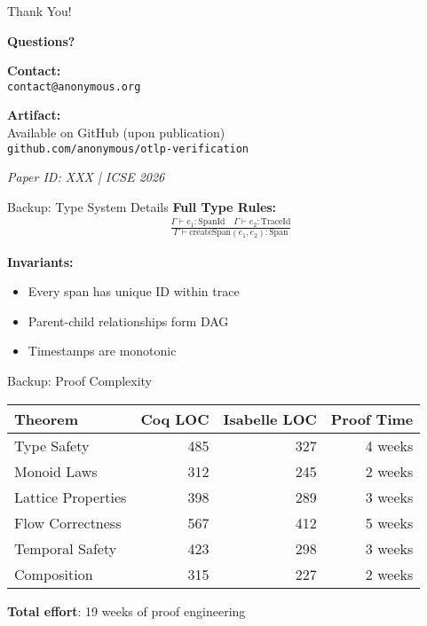\documentclass[aspectratio=169,xcolor=dvipsnames]{beamer}
\begin{document}
\begin{frame}{Thank You!}
\begin{center}
{\LARGE \textbf{Questions?}}

\vspace{2em}

\textbf{Contact:}\\
\texttt{contact@anonymous.org}

\vspace{1em}

\textbf{Artifact:}\\
Available on GitHub (upon publication)\\
\texttt{github.com/anonymous/otlp-verification}

\vspace{2em}

\textit{Paper ID: XXX | ICSE 2026}
\end{center}
\end{frame}

\appendix

\begin{frame}{Backup: Type System Details}
\textbf{Full Type Rules:}
\begin{align*}
\frac{\Gamma \vdash e_1 : \text{SpanId} \quad \Gamma \vdash e_2 : \text{TraceId}}
     {\Gamma \vdash \text{createSpan}(e_1, e_2) : \text{Span}}
\end{align*}

\textbf{Invariants:}
\begin{itemize}
    \item Every span has unique ID within trace
    \item Parent-child relationships form DAG
    \item Timestamps are monotonic
\end{itemize}
\end{frame}

\begin{frame}{Backup: Proof Complexity}
\begin{center}
\begin{tabular}{lrrr}
\toprule
\textbf{Theorem} & \textbf{Coq LOC} & \textbf{Isabelle LOC} & \textbf{Proof Time} \\
\midrule
Type Safety & 485 & 327 & 4 weeks \\
Monoid Laws & 312 & 245 & 2 weeks \\
Lattice Properties & 398 & 289 & 3 weeks \\
Flow Correctness & 567 & 412 & 5 weeks \\
Temporal Safety & 423 & 298 & 3 weeks \\
Composition & 315 & 227 & 2 weeks \\
\bottomrule
\end{tabular}
\end{center}

\textbf{Total effort}: 19 weeks of proof engineering
\end{frame}
\end{document}
